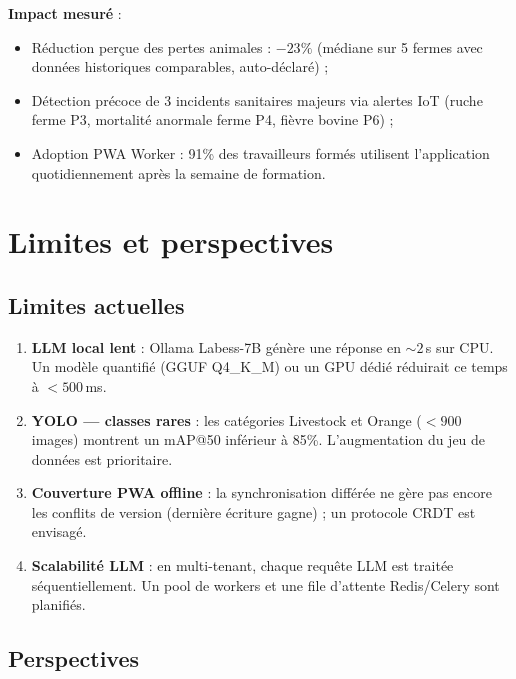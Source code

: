 \textbf{Impact mesuré} :
\begin{itemize}
  \item Réduction perçue des pertes animales : $-23\%$ (médiane sur 5 fermes
        avec données historiques comparables, auto-déclaré) ;
  \item Détection précoce de 3 incidents sanitaires majeurs via alertes
        IoT (ruche ferme P3, mortalité anormale ferme P4, fièvre bovine P6) ;
  \item Adoption PWA Worker : 91\% des travailleurs formés utilisent
        l'application quotidiennement après la semaine de formation.
\end{itemize}

\section{Limites et perspectives}

\subsection{Limites actuelles}

\begin{enumerate}
  \item \textbf{LLM local lent} : Ollama Labess-7B génère une réponse en
        $\sim 2$\,s sur CPU. Un modèle quantifié (GGUF Q4\_K\_M) ou un GPU
        dédié réduirait ce temps à $< 500$\,ms.
  \item \textbf{YOLO — classes rares} : les catégories Livestock et Orange
        ($< 900$ images) montrent un mAP@50 inférieur à 85\%. L'augmentation
        du jeu de données est prioritaire.
  \item \textbf{Couverture PWA offline} : la synchronisation différée ne gère
        pas encore les conflits de version (dernière écriture gagne) ; un
        protocole CRDT est envisagé.
  \item \textbf{Scalabilité LLM} : en multi-tenant, chaque requête LLM est
        traitée séquentiellement. Un pool de workers et une file d'attente
        Redis/Celery sont planifiés.
\end{enumerate}

\subsection{Perspectives}

